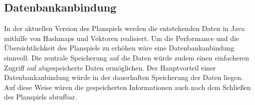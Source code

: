 \subsection{Datenbankanbindung}
\label{sec:fazit-spielverlauf-datenbankanbindung}

In der aktuellen Version des Planspiels werden die entstehenden Daten in Java mithilfe von Hashmaps und Vektoren realisiert. Um die Performance und die Übersichtlichkeit des Planspiels zu erhöhen wäre eine Datenbankanbindung sinnvoll. Die zentrale Speicherung auf die Daten würde zudem einen einfacheren Zugriff auf abgespeicherte Daten ermöglichen. Der Hauptvorteil einer Datenbankanbindung würde in der dauerhaften Speicherung der Daten liegen. Auf diese Weise wären die gespeicherten Informationen auch nach dem Schließen des Planspiels abrufbar.